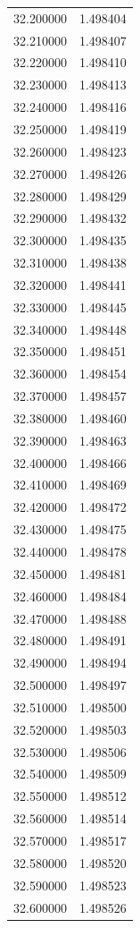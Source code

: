 \begin{tabular}{rr}
32.200000 & 1.498404 \\
32.210000 & 1.498407 \\
32.220000 & 1.498410 \\
32.230000 & 1.498413 \\
32.240000 & 1.498416 \\
32.250000 & 1.498419 \\
32.260000 & 1.498423 \\
32.270000 & 1.498426 \\
32.280000 & 1.498429 \\
32.290000 & 1.498432 \\
32.300000 & 1.498435 \\
32.310000 & 1.498438 \\
32.320000 & 1.498441 \\
32.330000 & 1.498445 \\
32.340000 & 1.498448 \\
32.350000 & 1.498451 \\
32.360000 & 1.498454 \\
32.370000 & 1.498457 \\
32.380000 & 1.498460 \\
32.390000 & 1.498463 \\
32.400000 & 1.498466 \\
32.410000 & 1.498469 \\
32.420000 & 1.498472 \\
32.430000 & 1.498475 \\
32.440000 & 1.498478 \\
32.450000 & 1.498481 \\
32.460000 & 1.498484 \\
32.470000 & 1.498488 \\
32.480000 & 1.498491 \\
32.490000 & 1.498494 \\
32.500000 & 1.498497 \\
32.510000 & 1.498500 \\
32.520000 & 1.498503 \\
32.530000 & 1.498506 \\
32.540000 & 1.498509 \\
32.550000 & 1.498512 \\
32.560000 & 1.498514 \\
32.570000 & 1.498517 \\
32.580000 & 1.498520 \\
32.590000 & 1.498523 \\
32.600000 & 1.498526 \\

\end{tabular}
